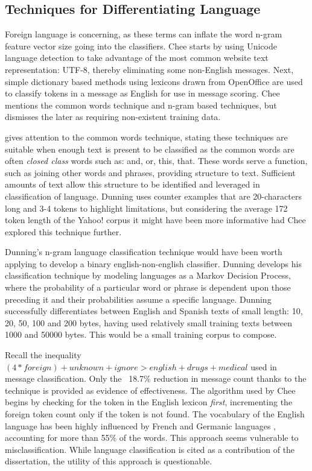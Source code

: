 \documentclass[twoside,11pt]{article}
\begin{document}
\subsection{Techniques for Differentiating Language}
Foreign language is concerning, as these terms can inflate the word n-gram feature vector size going into the classifiers. Chee starts by using Unicode language detection to take advantage of the most common website text representation: UTF-8, thereby eliminating some non-English messages. Next, simple dictionary based methods using lexicons drawn from OpenOffice are used to classify tokens in a message as English for use in message scoring. Chee mentions the common words technique and n-gram based techniques, but dismisses the later as requiring non-existent training data.
\par \citet{Dunning} gives attention to the common words technique, stating these techniques are suitable when enough text is present to be classified as the common words are often \textit{closed class} words such as: and, or, this, that. These words serve a function, such as joining other words and phrases, providing structure to text. Sufficient amounts of text allow this structure to be identified and leveraged in classification of language. Dunning uses counter examples that are 20-characters long and 3-4 tokens to highlight limitations, but considering the average 172 token length of the Yahoo! corpus it might have been more informative had Chee explored this technique further.
\par Dunning's n-gram language classification technique would have been worth applying to develop a binary english-non-english classifier. Dunning develops his classification technique by modeling languages as a Markov Decision Process, where the probability of a particular word or phrase is dependent upon those preceding it and their probabilities assume a specific language. Dunning successfully differentiates between English and Spanish texts of small length: 10, 20, 50, 100 and 200 bytes, having used relatively small training texts between 1000 and 50000 bytes. This would be a small training corpus to compose.
\par Recall the inequality $(4 * foreign) + unknown + ignore > english + drugs + medical$ used in message classification. Only the ~18.7\% reduction in message count thanks to the technique is provided as evidence of effectiveness. The algorithm used by Chee begins by checking for the token in the English lexicon \textit{first}, incrementing the foreign token count only if the token is not found. The vocabulary of the English language has been highly influenced by French and Germanic languages \citep{English}, accounting for more than 55\% of the words. This approach seems vulnerable to misclassification. While language classification is cited as a contribution of the dissertation, the utility of this approach is questionable.
\end{document}
